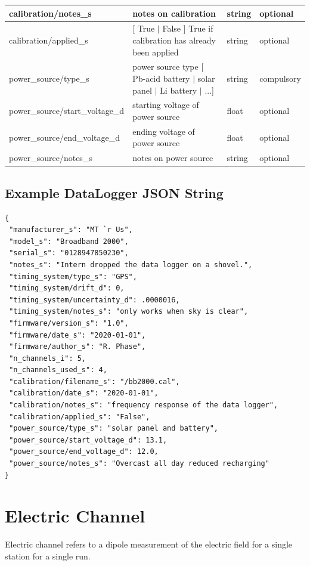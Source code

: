 \documentclass{article}
\begin{document}
\begin{table}[htb!]
\begin{tabular}{|l|p{3in}|l|l|}
		calibration/notes\_s & notes on calibration & string & optional \\ \hline
		calibration/applied\_s & [ True $|$ False ] True if calibration has already been applied & string & optional \\ \hline
		power\_source/type\_s & power source type [ Pb-acid battery $|$ solar panel $|$ Li battery $|$ ...] & string & compulsory \\ \hline
		power\_source/start\_voltage\_d & starting voltage of power source & float & optional \\ \hline
		power\_source/end\_voltage\_d & ending voltage of power source & float & optional \\ \hline
		power\_source/notes\_s & notes on power source & string & optional \\ \hline
	\end{tabular}
	\label{tab:datalogger}
\end{table}	

\newpage
\subsection{Example DataLogger JSON String}

\begin{verbatim}
{
 "manufacturer_s": "MT `r Us",
 "model_s": "Broadband 2000",
 "serial_s": "0128947850230",
 "notes_s": "Intern dropped the data logger on a shovel.",
 "timing_system/type_s": "GPS",
 "timing_system/drift_d": 0,
 "timing_system/uncertainty_d": .0000016,
 "timing_system/notes_s": "only works when sky is clear",
 "firmware/version_s": "1.0",
 "firmware/date_s": "2020-01-01",
 "firmware/author_s": "R. Phase",
 "n_channels_i": 5,
 "n_channels_used_s": 4,
 "calibration/filename_s": "/bb2000.cal",
 "calibration/date_s": "2020-01-01",
 "calibration/notes_s": "frequency response of the data logger",
 "calibration/applied_s": "False",
 "power_source/type_s": "solar panel and battery",
 "power_source/start_voltage_d": 13.1,
 "power_source/end_voltage_d": 12.0,
 "power_source/notes_s": "Overcast all day reduced recharging"
}
\end{verbatim}

\newpage
\section{Electric Channel}

Electric channel refers to a dipole measurement of the electric field for a single station for a single run.
 
\end{document}
